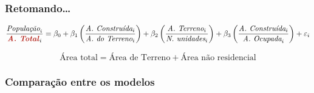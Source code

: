 \documentclass[%
    9pt, 
    aspectratio=169,
]{beamer}
\begin{document}
\begin{frame}
    \frametitle{Retomando\dots}
    \begin{equation*}
        \frac{\textit{População}_i}{\textcolor{BrickRed}{\textbf{\textit{A. Total}}}_i}
        =\beta_0
        +\beta_1\left(\frac{\textit{A. Construída}_i}{\textit{A. do Terreno}_i}\right)
        +\beta_2\left(\frac{\textit{A. Terreno}_i}{\textit{N. unidades}_i}\right)
        +\beta_3\left(\frac{\textit{A. Construída}_i}{\textit{A. Ocupada}_i}\right)
        +\varepsilon_i
    \end{equation*}

    \vspace{50pt}

    \begin{equation*}
        \text{Área total} = \text{Área de Terreno} + \text{Área não residencial}
    \end{equation*}

\end{frame}

\begin{frame}
    \frametitle{Comparação entre os modelos}
    \centering

    \begin{table}
        \centering
        \caption{Resultados utilizando área total para calcular a densidade}
    \end{table}

    \vspace{10pt}

    \begin{table}
        \centering
        \caption{Resultados utilizando área do terreno para calcular a densidade}
    \end{table}
    
    
\end{frame}
\end{document}
